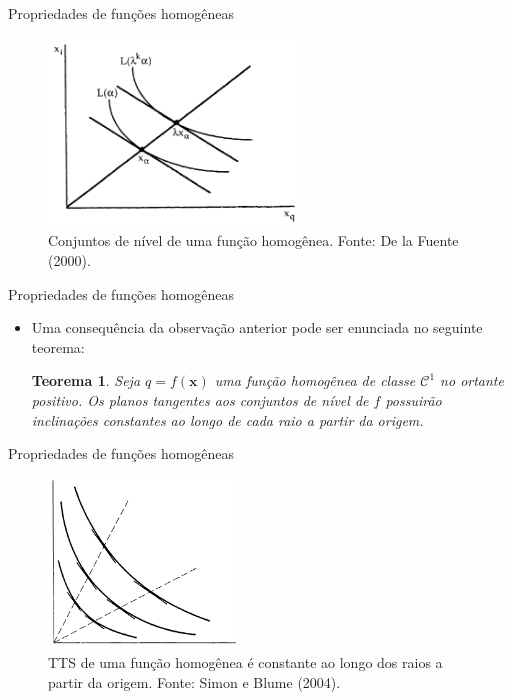 \documentclass[10pt]{beamer}
\newtheorem{teo}{Teorema}
\begin{document}
\begin{frame}{Propriedades de funções homogêneas}
    \begin{figure}
        \centering
        \includegraphics[width=0.6\textwidth]{./figures/aula14_fig3.PNG}
        \caption{Conjuntos de nível de uma função homogênea. Fonte: De la Fuente (2000).}
        \label{fig4}
    \end{figure}
\end{frame}

\begin{frame}{Propriedades de funções homogêneas}
    \begin{itemize}
        \item Uma consequência da observação anterior pode ser enunciada no seguinte teorema:     \bigskip
        \begin{teo}
            Seja $q = f(\mathbf{x})$ uma função homogênea de classe $\mathcal{C}^1$ no ortante positivo. Os planos tangentes aos conjuntos de nível de $f$ possuirão inclinações constantes ao longo de cada raio a partir da origem.
        \end{teo}
    \end{itemize}
\end{frame}

\begin{frame}{Propriedades de funções homogêneas}
    \begin{figure}
        \centering
        \includegraphics[width=0.45\textwidth]{./figures/aula14_fig4.PNG}
        \caption{TTS de uma função homogênea é constante ao longo dos raios a partir da origem. Fonte: Simon e Blume (2004).}
        \label{fig5}
    \end{figure}
\end{frame}
\end{document}
